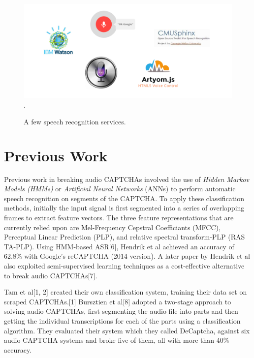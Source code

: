 \begin{figure}[t]
   \centering
   \includegraphics[width=\columnwidth]{figures/Picture2.png}.
   \caption{A few speech recognition services.}
   \label{fig:speechrecognizers}
\end{figure}

\section{Previous Work}
\label{sec:previous}

Previous work in breaking audio CAPTCHAs involved the use of \textit{Hidden Markov Models (HMMs)} or \textit{Artificial Neural Networks} (ANNs) to perform automatic speech recognition on segments of the CAPTCHA. To apply these classification methods, initially the input signal is first segmented into a series of overlapping frames to extract feature vectors. The three feature representations that are currently relied upon are Mel-Frequency Cepstral Coefficiants (MFCC), Perceptual  Linear  Prediction  (PLP),  and relative  spectral  transform-PLP  (RAS TA-PLP). Using HMM-based ASR[6], Hendrik et al achieved an accuracy of 62.8\% with Google's reCAPTCHA (2014 version). A later paper by Hendrik et al also exploited semi-supervised learning techniques as a cost-effective alternative to break audio CAPTCHAs[7]. \newline

Tam et al[1, 2] created their own classification system, training their data set on scraped CAPTCHAs.[1] Bursztien et al[8] adopted a two-stage approach to solving audio CAPTCHAs, first segmenting the audio file into parts and then getting the individual transcriptions for each of the parts using a classification algorithm. They evaluated their system which they called DeCaptcha, against six audio CAPTCHA systems and broke five of them, all with more than 40\% accuracy.\newline

